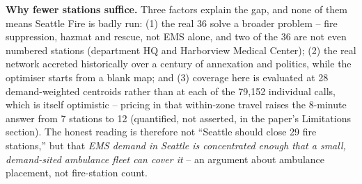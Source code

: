 \documentclass[11pt]{article}
\begin{document}
\textbf{Why fewer stations suffice.} Three factors explain the gap, and none
of them means Seattle Fire is badly run: (1) the real 36 solve a broader
problem -- fire suppression, hazmat and rescue, not EMS alone, and two of the
36 are not even numbered stations (department HQ and Harborview Medical
Center); (2) the real network accreted historically over a century of
annexation and politics, while the optimiser starts from a blank map; and (3)
coverage here is evaluated at 28 demand-weighted centroids rather than at
each of the 79{,}152 individual calls, which is itself optimistic -- pricing
in that within-zone travel raises the 8-minute answer from 7 stations to 12
(quantified, not asserted, in the paper's Limitations section). The honest
reading is therefore not ``Seattle should close 29 fire stations,'' but that
\emph{EMS demand in Seattle is concentrated enough that a small,
demand-sited ambulance fleet can cover it} -- an argument about ambulance
placement, not fire-station count.
\end{document}

